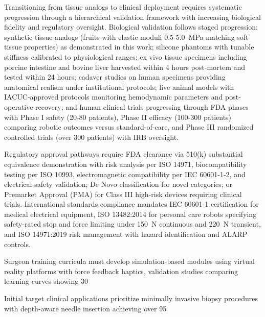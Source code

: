 \documentclass[journal]{IEEEtran}
\begin{document}
Transitioning from tissue analogs to clinical deployment requires systematic progression through a hierarchical validation framework with increasing biological fidelity and regulatory oversight. Biological validation follows staged progression: synthetic tissue analogs (fruits with elastic moduli 0.5-5.0~MPa matching soft tissue properties) as demonstrated in this work; silicone phantoms with tunable stiffness calibrated to physiological ranges; ex vivo tissue specimens including porcine intestine and bovine liver harvested within 4 hours post-mortem and tested within 24 hours; cadaver studies on human specimens providing anatomical realism under institutional protocols; live animal models with IACUC-approved protocols monitoring hemodynamic parameters and post-operative recovery; and human clinical trials progressing through FDA phases with Phase I safety (20-80 patients), Phase II efficacy (100-300 patients) comparing robotic outcomes versus standard-of-care, and Phase III randomized controlled trials (over 300 patients) with IRB oversight.

Regulatory approval pathways require FDA clearance via 510(k) substantial equivalence demonstration with risk analysis per ISO 14971, biocompatibility testing per ISO 10993, electromagnetic compatibility per IEC 60601-1-2, and electrical safety validation; De Novo classification for novel categories; or Premarket Approval (PMA) for Class III high-risk devices requiring clinical trials. International standards compliance mandates IEC 60601-1 certification for medical electrical equipment, ISO 13482:2014 for personal care robots specifying safety-rated stop and force limiting under 150~N continuous and 220~N transient, and ISO 14971:2019 risk management with hazard identification and ALARP controls.

Surgeon training curricula must develop simulation-based modules using virtual reality platforms with force feedback haptics, validation studies comparing learning curves showing 30%

Initial target clinical applications prioritize minimally invasive biopsy procedures with depth-aware needle insertion achieving over 95%
\end{document}
